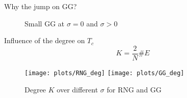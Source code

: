 \documentclass{beamer}
\begin{document}
        \begin{frame}{Why the jump on GG?}
            \begin{figure}[htbp]
                \centering
                \resizebox{0.9\textwidth}{!}{
                    \subfigure{
                        \label{sfig:GGEdge:before}
                        
                    }
                    \subfigure{
                        \label{sfig:GGEdge:after}
                        
                    }
                }
                \caption
                {
                    Small GG at \(\sigma = 0\) and \(\sigma > 0\)
                }
                \label{fig:GGEdge}
            \end{figure}
        \end{frame}

        \begin{frame}{Influence of the degree on \(T_{c}\)}
            \begin{equation}
                K = \frac{2}{N} \# E
                \label{eq:degree}
            \end{equation}
            \begin{figure}[htbp]
                \centering
                \subfigure
                {
                    \label{sfig:deg:RNG}
                    \texttt{[image: plots/RNG\_deg]}
                }
                \subfigure
                {
                    \label{sfig:deg:GG}
                    \texttt{[image: plots/GG\_deg]}
                }
                \caption
                {
                    Degree \(K\) over different \(\sigma\) for RNG and GG
                }
                \label{fig:Tc_deg}
            \end{figure}
        \end{frame}
\end{document}
